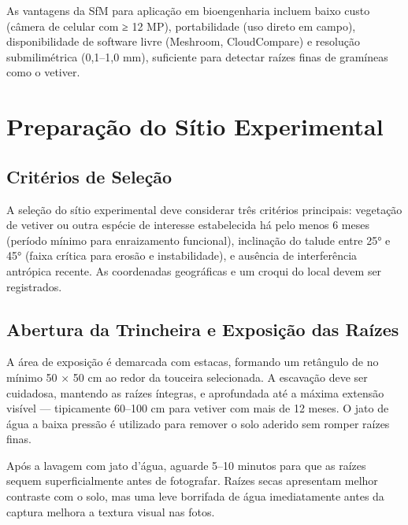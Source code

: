 \documentclass[
  portuguese,
  11pt,
  a4paper,
  open=any]{scrbook}
\begin{document}
As vantagens da SfM para aplicação em bioengenharia incluem baixo custo
(câmera de celular com ≥ 12 MP), portabilidade (uso direto em campo),
disponibilidade de software livre (Meshroom, CloudCompare) e resolução
submilimétrica (0,1--1,0 mm), suficiente para detectar raízes finas de
gramíneas como o vetiver.

\section{Preparação do Sítio
Experimental}\label{preparauxe7uxe3o-do-suxedtio-experimental}

\subsection{Critérios de Seleção}\label{crituxe9rios-de-seleuxe7uxe3o}

A seleção do sítio experimental deve considerar três critérios
principais: vegetação de vetiver ou outra espécie de interesse
estabelecida há pelo menos 6 meses (período mínimo para enraizamento
funcional), inclinação do talude entre 25° e 45° (faixa crítica para
erosão e instabilidade), e ausência de interferência antrópica recente.
As coordenadas geográficas e um croqui do local devem ser registrados.

\subsection{Abertura da Trincheira e Exposição das
Raízes}\label{abertura-da-trincheira-e-exposiuxe7uxe3o-das-rauxedzes}

A área de exposição é demarcada com estacas, formando um retângulo de no
mínimo 50 × 50 cm ao redor da touceira selecionada. A escavação deve ser
cuidadosa, mantendo as raízes íntegras, e aprofundada até a máxima
extensão visível --- tipicamente 60--100 cm para vetiver com mais de 12
meses. O jato de água a baixa pressão é utilizado para remover o solo
aderido sem romper raízes finas.

\begin{tcolorbox}[enhanced jigsaw, leftrule=.75mm, colframe=quarto-callout-tip-color-frame, colback=white, bottomrule=.15mm, opacityback=0, colbacktitle=quarto-callout-tip-color!10!white, breakable, bottomtitle=1mm, opacitybacktitle=0.6, title=\textcolor{quarto-callout-tip-color}{\faLightbulb}\hspace{0.5em}{Dica de Campo}, titlerule=0mm, toprule=.15mm, toptitle=1mm, rightrule=.15mm, left=2mm, arc=.35mm, coltitle=black]

Após a lavagem com jato d'água, aguarde 5--10 minutos para que as raízes
sequem superficialmente antes de fotografar. Raízes secas apresentam
melhor contraste com o solo, mas uma leve borrifada de água
imediatamente antes da captura melhora a textura visual nas fotos.

\end{tcolorbox}
\end{document}
